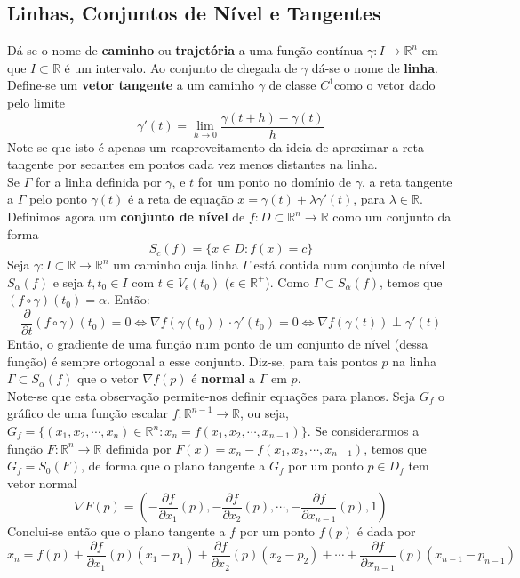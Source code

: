 \documentclass{article}
\begin{document}
\subsection{Linhas, Conjuntos de Nível e Tangentes}
Dá-se o nome de \textbf{caminho} ou \textbf{trajetória} a uma função contínua $\gamma: I \to \mathbb{R}^n$ em que $I \subset \mathbb{R}$ é um intervalo. Ao conjunto de chegada de $\gamma$ dá-se o nome de \textbf{linha}.\\
Define-se um \textbf{vetor tangente} a um caminho $\gamma$ de classe $C^1$como o vetor dado pelo limite
$$
\gamma '(t) = \lim_{h \to 0} \frac{\gamma(t+h)-\gamma(t)}{h}
$$
Note-se que isto é apenas um reaproveitamento da ideia de aproximar a reta tangente por secantes em pontos cada vez menos distantes na linha.\\
Se $\Gamma$ for a linha definida por $\gamma$, e $t$ for um ponto no domínio de $\gamma$, a reta tangente a $\Gamma$ pelo ponto $\gamma (t)$ é a reta de equação $x = \gamma(t) + \lambda \gamma '(t)$, para $\lambda \in \mathbb{R}$. \\
Definimos agora um \textbf{conjunto de nível} de $f: D \subset \mathbb{R}^n \to \mathbb{R}$ como um conjunto da forma 
$$
S_c(f) = \{ x \in D: f(x)=c \}
$$
Seja $\gamma: I \subset \mathbb{R} \to \mathbb{R}^n$ um caminho cuja linha $\Gamma$ está contida num conjunto de nível $S_\alpha (f)$ e seja $t, t_0 \in I$ com $t \in V_\epsilon(t_0)$ ($\epsilon \in \mathbb{R}^+$). Como $\Gamma \subset S_\alpha(f)$, temos que $(f \circ \gamma) (t_0) = \alpha$. Então:
$$
\frac{\partial}{\partial t} (f \circ \gamma)(t_0) = 0 \Leftrightarrow \nabla f(\gamma(t_0)) \cdot \gamma'(t_0) = 0 \Leftrightarrow \nabla f(\gamma (t)) \perp \gamma'(t)
$$
Então, o gradiente de uma função num ponto de um conjunto de nível (dessa função) é sempre ortogonal a esse conjunto. Diz-se, para tais pontos $p$ na linha $\Gamma \subset S_\alpha (f)$ que o vetor $\nabla f(p)$ é \textbf{normal} a $\Gamma$ em $p$.\\ 
Note-se que esta observação permite-nos definir equações para planos. Seja $G_f$ o gráfico de uma função escalar $f: \mathbb{R}^{n-1} \to \mathbb{R}$, ou seja, $G_f = \{ (x_1, x_2, \cdots, x_n) \in \mathbb{R}^n : x_n = f(x_1, x_2, \cdots , x_{n-1}) \}$. Se considerarmos a função $F: \mathbb{R}^n \to \mathbb{R}$ definida por $F(x) = x_n - f(x_1, x_2, \cdots , x_{n-1})$, temos que $G_f = S_0(F)$, de forma que o plano tangente a $G_f$ por um ponto $p \in D_f$ tem vetor normal 
$$
\nabla F(p) = \left( -\frac{\partial f}{\partial x_1}(p), -\frac{\partial f}{\partial x_2}(p), \cdots , -\frac{\partial f}{\partial x_{n-1}}(p), 1 \right)  
$$
Conclui-se então que o plano tangente a $f$ por um ponto $f(p)$ é dada por
$$
x_n = f(p) + \frac{\partial f}{\partial x_1}(p)(x_1-p_1) + \frac{\partial f}{\partial x_2}(p)(x_2-p_2) + \cdots + \frac{\partial f}{\partial x_{n-1}}(p)(x_{n-1}-p_{n-1}) 
$$
\end{document}
